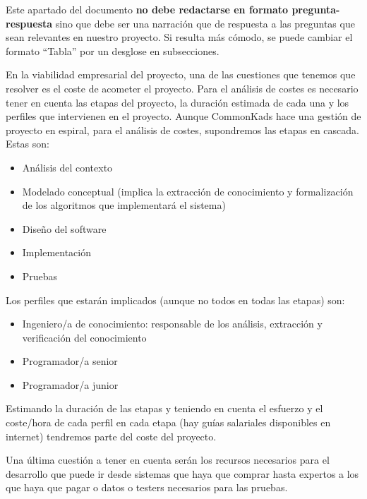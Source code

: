 \documentclass[12pt,a4paper,twoside,spanish]{article}      %
\begin{document}
{\color{blue}
Este apartado del documento \textbf{no debe redactarse en formato pregunta-respuesta} sino que debe ser una narración que de respuesta a las preguntas que sean relevantes en nuestro proyecto. Si resulta más cómodo, se puede cambiar el formato ``Tabla'' por un desglose en subsecciones. 

 En la viabilidad empresarial del proyecto, una de las cuestiones que tenemos que resolver es el coste de acometer el proyecto. Para el análisis de costes es necesario tener en cuenta las etapas del proyecto, la duración estimada de cada una y los perfiles que intervienen en el proyecto. Aunque CommonKads hace una gestión de proyecto en espiral, para el análisis de costes, supondremos las etapas en cascada. Estas son:
 \begin{itemize}
 	\item Análisis del contexto
 	\item Modelado conceptual (implica la extracción de conocimiento y formalización de los algoritmos que implementará el sistema)
 	\item Diseño del software
 	\item Implementación
 	\item Pruebas 	
 \end{itemize}

Los perfiles que estarán implicados (aunque no todos en todas las etapas) son: 
\begin{itemize}
	\item Ingeniero/a de conocimiento: responsable de los análisis, extracción y verificación del conocimiento
	\item Programador/a senior
	\item Programador/a junior
\end{itemize}

Estimando la duración de las etapas y teniendo en cuenta el esfuerzo y el coste/hora de cada perfil en cada etapa (hay guías salariales disponibles en internet) tendremos parte del coste del proyecto.

Una última cuestión a tener en cuenta serán los recursos necesarios para el desarrollo que puede ir desde sistemas que haya que comprar hasta expertos a los que haya que pagar o datos o testers necesarios para las pruebas.  

}
\end{document}

